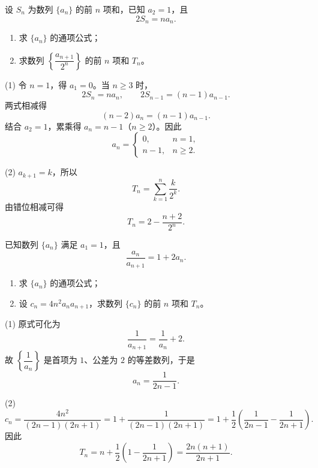 \begin{question}[points=12]
设 $S_n$ 为数列 $\{a_n\}$ 的前 $n$ 项和，已知 $a_2=1$，且
\[
 2S_n=na_n.
\]
\begin{enumerate}
  \item 求 $\{a_n\}$ 的通项公式；
  \item 求数列 $\left\{\dfrac{a_{n+1}}{2^n}\right\}$ 的前 $n$ 项和 $T_n$。
\end{enumerate}
\begin{solution}
(1) 令 $n=1$，得 $a_1=0$。当 $n\ge3$ 时，
\[
 2S_n=na_n,\qquad 2S_{n-1}=(n-1)a_{n-1}.
\]
两式相减得
\[
 (n-2)a_n=(n-1)a_{n-1}.
\]
结合 $a_2=1$，累乘得 $a_n=n-1$（$n\ge2$）。因此
\[
 \boxed{a_n=\begin{cases}0,&n=1,\\n-1,&n\ge2.
 \end{cases}}
\]

(2) $a_{k+1}=k$，所以
\[
 T_n=\sum_{k=1}^{n}\frac{k}{2^k}.
\]
由错位相减可得
\[
 \boxed{T_n=2-\frac{n+2}{2^n}}.
\]
\end{solution}
\end{question}

\begin{question}[points=12]
已知数列 $\{a_n\}$ 满足 $a_1=1$，且
\[
 \frac{a_n}{a_{n+1}}=1+2a_n.
\]
\begin{enumerate}
  \item 求 $\{a_n\}$ 的通项公式；
  \item 设 $c_n=4n^2a_na_{n+1}$，求数列 $\{c_n\}$ 的前 $n$ 项和 $T_n$。
\end{enumerate}
\begin{solution}
(1) 原式可化为
\[
 \frac1{a_{n+1}}=\frac1{a_n}+2.
\]
故 $\left\{\dfrac1{a_n}\right\}$ 是首项为 $1$、公差为 $2$ 的等差数列，于是
\[
 \boxed{a_n=\frac1{2n-1}}.
\]

(2)
\[
 c_n=\frac{4n^2}{(2n-1)(2n+1)}
 =1+\frac1{(2n-1)(2n+1)}
 =1+\frac12\left(\frac1{2n-1}-\frac1{2n+1}\right).
\]
因此
\[
 T_n=n+\frac12\left(1-\frac1{2n+1}\right)
 =\boxed{\frac{2n(n+1)}{2n+1}}.
\]
\end{solution}
\end{question}

